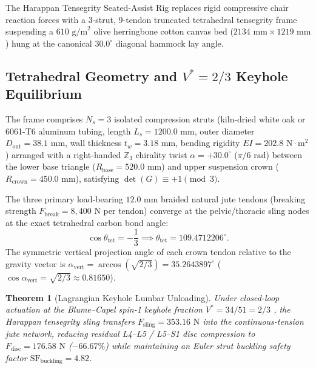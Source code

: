\documentclass[aps,prl,twocolumn,superscriptaddress,10pt]{revtex4-2}
\newtheorem{theorem}{Theorem}[section]
\begin{document}
The Harappan Tensegrity Seated-Assist Rig replaces rigid compressive chair reaction forces with a 3-strut, 9-tendon truncated tetrahedral tensegrity frame suspending a $610\text{ g/m}^2$ olive herringbone cotton canvas bed ($2134\text{ mm} \times 1219\text{ mm}$) hung at the canonical $30.0^\circ$ diagonal hammock lay angle.

\subsection{Tetrahedral Geometry and \texorpdfstring{$V^* = 2/3$}{V* = 2/3} Keyhole Equilibrium}

The frame comprises $N_s = 3$ isolated compression struts (kiln-dried white oak or 6061-T6 aluminum tubing, length $L_s = 1200.0\text{ mm}$, outer diameter $D_{\text{out}} = 38.1\text{ mm}$, wall thickness $t_w = 3.18\text{ mm}$, bending rigidity $EI = 202.8\text{ N}\cdot\text{m}^2$) arranged with a right-handed $\mathbb{Z}_3$ chirality twist $\alpha = +30.0^\circ$ ($\pi/6\text{ rad}$) between the lower base triangle ($R_{\text{base}} = 520.0\text{ mm}$) and upper suspension crown ($R_{\text{crown}} = 450.0\text{ mm}$), satisfying $\det(G) \equiv +1 \pmod 3$.

The three primary load-bearing $12.0\text{ mm}$ braided natural jute tendons (breaking strength $F_{\text{break}} = 8,400\text{ N}$ per tendon) converge at the pelvic/thoracic sling nodes at the exact tetrahedral carbon bond angle:
\begin{equation}
\cos\theta_{\text{tet}} = -\frac{1}{3} \implies \theta_{\text{tet}} = 109.4712206^\circ.
\label{eq:theta_tet}
\end{equation}
The symmetric vertical projection angle of each crown tendon relative to the gravity vector is $\alpha_{\text{vert}} = \arccos(\sqrt{2/3}) = 35.2643897^\circ$ ($\cos\alpha_{\text{vert}} = \sqrt{2/3} \approx 0.81650$).

\begin{theorem}[Lagrangian Keyhole Lumbar Unloading]
\label{thm:tensegrity_unloading}
Under closed-loop actuation at the Blume--Capel spin-1 keyhole fraction $V^* = 34/51 = 2/3$ \cite{Blume1966}, the Harappan tensegrity sling transfers $F_{\text{sling}} = 353.16\text{ N}$ into the continuous-tension jute network, reducing residual L4--L5 / L5--S1 disc compression to $F_{\text{disc}} = 176.58\text{ N}$ ($-66.67\%$) while maintaining an Euler strut buckling safety factor $\text{SF}_{\text{buckling}} = 4.82$.
\end{theorem}
\end{document}
